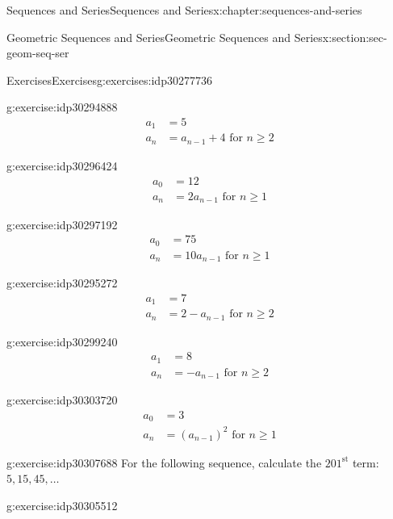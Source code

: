 \documentclass[twoside,10pt,]{book}
\numberwithin{equation}{section}
\newcommand{\upst}[1]{{#1^{\text{st}}}}
\newcommand{\amp}{&}
\begin{document}
\begin{chapterptx}{Sequences and Series}{}{Sequences and Series}{}{}{x:chapter:sequences-and-series}
\begin{sectionptx}{Geometric Sequences and Series}{}{Geometric Sequences and Series}{}{}{x:section:sec-geom-seq-ser}
\begin{exercises-subsection}{Exercises}{}{Exercises}{}{}{g:exercises:idp30277736}
\begin{exercisegroup}
\begin{divisionexerciseeg}{13}{}{}{g:exercise:idp30294888}
%
\begin{align*}
a_1\amp = 5\\
a_n \amp = a_{n - 1} + 4   \text{   for } n \ge 2
\end{align*}
\end{divisionexerciseeg}%
\begin{divisionexerciseeg}{14}{}{}{g:exercise:idp30296424}%
%
\begin{align*}
a_0 \amp = 12\\
a_n \amp = 2a_{n-1} \text{   for } n\ge 1
\end{align*}
\end{divisionexerciseeg}%
\begin{divisionexerciseeg}{15}{}{}{g:exercise:idp30297192}%
%
\begin{align*}
a_0\amp = 75\\
a_n\amp = 10a_{n-1} \text{   for } n\ge 1
\end{align*}
\end{divisionexerciseeg}%
\begin{divisionexerciseeg}{16}{}{}{g:exercise:idp30295272}%
%
\begin{align*}
a_1 \amp = 7\\
a_n\amp = 2-a_{n-1} \text{   for } n\ge 2
\end{align*}
\end{divisionexerciseeg}%
\begin{divisionexerciseeg}{17}{}{}{g:exercise:idp30299240}%
%
\begin{align*}
a_1 \amp = 8\\
a_n \amp = -a_{n-1} \text{   for } n\ge 2
\end{align*}
\end{divisionexerciseeg}%
\begin{divisionexerciseeg}{18}{}{}{g:exercise:idp30303720}%
%
\begin{align*}
a_0 \amp = 3\\
a_n\amp = (a_{n-1})^2 \text{   for } n\ge 1
\end{align*}
\end{divisionexerciseeg}%
\end{exercisegroup}
\par\medskip\noindent
\begin{divisionexercise}{19}{}{}{g:exercise:idp30307688}%
For the following sequence, calculate the \(\upst{201}\) term:  \(5, 15, 45, \ldots\)\end{divisionexercise}%
\begin{divisionexercise}{20}{}{}{g:exercise:idp30305512}%

\end{divisionexercise}
\end{exercises-subsection}
\end{sectionptx}
\end{chapterptx}
\end{document}
